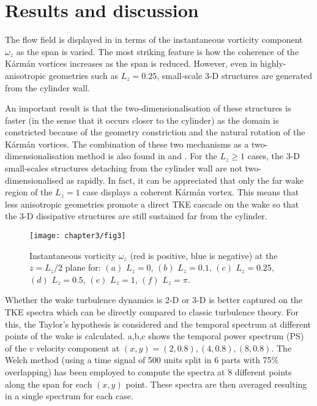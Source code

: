 \documentclass[../main.tex]{subfiles}
\begin{document}
\section{Results and discussion}\label{Results and discussion}

The flow field is displayed in  in terms of the instantaneous vorticity component $\omega_z$ as the span is varied.
The most striking feature is how the coherence of the K\'{a}rm\'{a}n vortices increases as the span is reduced.
However, even in highly-anisotropic geometries such as $L_z=0.25$, small-scale 3-D structures are generated from the cylinder wall.

An important result is that the two-dimensionalisation of these structures is faster (in the sense that it occurs closer to the cylinder) as the domain is constricted because of the geometry constriction and the natural rotation of the K\'{a}rm\'{a}n vortices.
The combination of these two mechanisms as a two-dimensionalisation method is also found in \cite{Smith1996} and \cite{Xia2011}.
For the $L_z\geq1$ cases, the 3-D small-scales structures detaching from the cylinder wall are not two-dimensionalised as rapidly.
In fact, it can be appreciated that only the far wake region of the $L_z=1$ case displays a coherent K\'{a}rm\'{a}n vortex.
This means that less anisotropic geometries promote a direct TKE cascade on the wake so that the 3-D dissipative structures are still sustained far from the cylinder.
\begin{figure}
	\vspace*{0.3cm}
  \centerline{\texttt{[image: chapter3/fig3]}}
  \caption{Instantaneous vorticity $\omega_z$ (red is positive, blue is negative) at the $z=L_z/2$ plane for: $(a)$ $L_z=0$, $(b)$ $L_z=0.1$, $(c)$ $L_z=0.25$, $(d)$ $L_z=0.5$, $(e)$ $L_z=1$, $(f)$ $L_z=\pi$.}
\label{fig:instantaneous_vorticity}
\end{figure}

Whether the wake turbulence dynamics is 2-D or 3-D is better captured on the TKE spectra which can be directly compared to classic turbulence theory.
For this, the Taylor's hypothesis is considered and the temporal spectrum at different points of the wake is calculated.
 a,b,c shows the temporal power spectrum (PS) of the $v$ velocity component at $(x,y)=(2,0.8),(4,0.8),(8,0.8)$.
The Welch method (using a time signal of 500 units split in 6 parts with 75\% overlapping) has been employed to compute the spectra at 8 different points along the span for each $(x,y)$ point.
These spectra are then averaged resulting in a single spectrum for each case.
\end{document}
